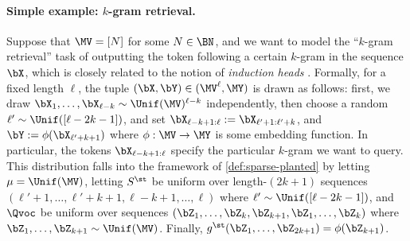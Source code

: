 \paragraph{Simple example: $k$-gram retrieval.}  %
Suppose that $\MV = [N]$ for some $N \in \BN$, and we want to model the ``$k$-gram retrieval'' task of outputting the token following a certain $k$-gram in the sequence $\bX$, which is closely related to the notion of \emph{induction heads} \cite{jelassi_repeat_2024,olsson_incontext_2022}. Formally, for a fixed length $\ell$, the tuple $(\bX, \bY) \in (\MV^\ell, \MY)$ is drawn as follows: first, we draw $\bX_1, \ldots, \bX_{\ell-k} \sim \Unif(\MV)^{\ell-k}$ independently, then choose a random $\ell' \sim \Unif([\ell-2k-1])$, and set $\bX_{\ell-k+1:\ell} := \bX_{\ell'+1:\ell'+k}$, and  $\bY := \phi(\bX_{\ell'+k+1})$ where $\phi : \MV \to \MY$ is some embedding function. In particular, the tokens $\bX_{\ell-k+1:\ell}$ specify the particular $k$-gram we want to query. This distribution falls into the framework of \cref{def:sparse-planted} by letting $\mu = \Unif(\MV)$, letting $S^\st$ be uniform over length-$(2k+1)$ sequences $(\ell'+1, \ldots, \ell'+k+1, \ell-k+1, \ldots, \ell)$ where $\ell' \sim \Unif([\ell-2k-1])$, and $\Qvoc$ be uniform over sequences $(\bZ_1, \ldots, \bZ_k, \bZ_{k+1}, \bZ_1, \ldots, \bZ_k)$ where $\bZ_1, \ldots, \bZ_{k+1} \sim \Unif(\MV)$. Finally, $g^\st(\bZ_1, \ldots, \bZ_{2k+1}) = \phi(\bZ_{k+1})$. 